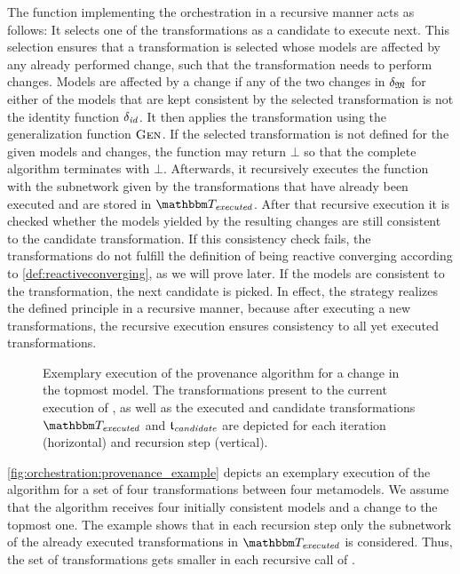 The function  implementing the orchestration in a recursive manner acts as follows:
It selects one of the transformations as a candidate to execute next.
This selection ensures that a transformation is selected whose models are affected by any already performed change, such that the transformation needs to perform changes.
Models are affected by a change if any of the two changes in $\delta_{\mathfrak{M}}$ for either of the models that are kept consistent by the selected transformation is not the identity function $\delta_{\mathit{id}}$.
It then applies the transformation using the generalization function $\textsc{Gen}_{}$.
If the selected transformation is not defined for the given models and changes, the function may return $\bot$ so that the complete algorithm terminates with $\bot$.
Afterwards, it recursively executes the function  with the subnetwork given by the transformations that have already been executed and are stored in $\provalgexecuted$.
After that recursive execution it is checked whether the models yielded by the resulting changes are still consistent to the candidate transformation.
If this consistency check fails, the transformations do not fulfill the definition of being reactive converging according to \autoref{def:reactiveconverging}, as we will prove later.
If the models are consistent to the transformation, the next candidate is picked.
In effect, the strategy realizes the defined principle in a recursive manner, because after executing a new transformations, the recursive execution ensures consistency to all yet executed transformations.

\begin{figure}
    \centering
    \resizebox{\textwidth}{!}{}
    \caption[Exemplary execution of the provenance algorithm]{%
    Exemplary execution of the provenance algorithm for a change in the topmost model. 
    The transformations present to the current execution of , as well as the executed and candidate transformations $\provalgexecuted$ and $\mathfrak{t}_{\mathit{candidate}}$ are depicted for each iteration (horizontal) and recursion step (vertical).
}
    \label{fig:orchestration:provenance_example}
\end{figure}

\autoref{fig:orchestration:provenance_example} depicts an exemplary execution of the  algorithm for a set of four transformations between four metamodels.
We assume that the algorithm receives four initially consistent models and a change to the topmost one.
The example shows that in each recursion step only the subnetwork of the already executed transformations in $\provalgexecuted$ is considered.
Thus, the set of transformations gets smaller in each recursive call of .


